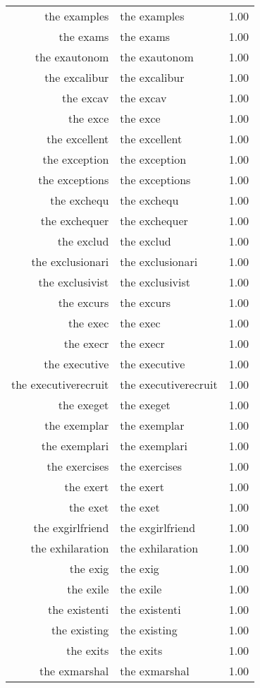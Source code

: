 \begin{table}[ht]
\begin{tabular}{rlr}
  the examples & the examples & 1.00 \\ 
  the exams & the exams & 1.00 \\ 
  the exautonom & the exautonom & 1.00 \\ 
  the excalibur & the excalibur & 1.00 \\ 
  the excav & the excav & 1.00 \\ 
  the exce & the exce & 1.00 \\ 
  the excellent & the excellent & 1.00 \\ 
  the exception & the exception & 1.00 \\ 
  the exceptions & the exceptions & 1.00 \\ 
  the exchequ & the exchequ & 1.00 \\ 
  the exchequer & the exchequer & 1.00 \\ 
  the exclud & the exclud & 1.00 \\ 
  the exclusionari & the exclusionari & 1.00 \\ 
  the exclusivist & the exclusivist & 1.00 \\ 
  the excurs & the excurs & 1.00 \\ 
  the exec & the exec & 1.00 \\ 
  the execr & the execr & 1.00 \\ 
  the executive & the executive & 1.00 \\ 
  the executiverecruit & the executiverecruit & 1.00 \\ 
  the exeget & the exeget & 1.00 \\ 
  the exemplar & the exemplar & 1.00 \\ 
  the exemplari & the exemplari & 1.00 \\ 
  the exercises & the exercises & 1.00 \\ 
  the exert & the exert & 1.00 \\ 
  the exet & the exet & 1.00 \\ 
  the exgirlfriend & the exgirlfriend & 1.00 \\ 
  the exhilaration & the exhilaration & 1.00 \\ 
  the exig & the exig & 1.00 \\ 
  the exile & the exile & 1.00 \\ 
  the existenti & the existenti & 1.00 \\ 
  the existing & the existing & 1.00 \\ 
  the exits & the exits & 1.00 \\ 
  the exmarshal & the exmarshal & 1.00 \\ 

\end{tabular}
\end{table}
